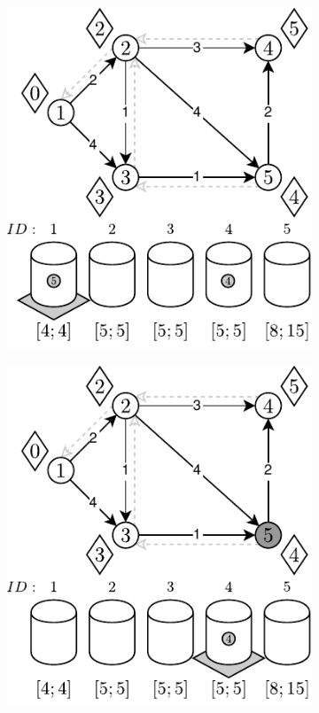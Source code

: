 \begin{figure}[!htbp]
\begin{subfigure}[b]{0.3\textwidth}
		\caption{}
	\end{subfigure}
	\begin{subfigure}[b]{0.3\textwidth}
		\includegraphics[width=\textwidth]{Chapter_II/7/e.pdf}
		\caption{}
	\end{subfigure}
	\begin{subfigure}[b]{0.3\textwidth}
		\includegraphics[width=\textwidth]{Chapter_II/7/f.pdf}

\end{subfigure}
\end{figure}
